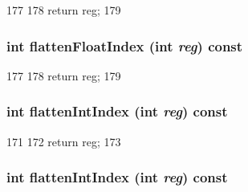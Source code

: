 \begin{DoxyCode}
177         {
178             return reg;
179         }
\end{DoxyCode}
\hypertarget{classMipsISA_1_1ISA_a85addcd4f57c5a0ffa81805dcad1eeb7}{
\subsubsection[{flattenFloatIndex}]{\setlength{\rightskip}{0pt plus 5cm}int flattenFloatIndex (int {\em reg}) const}}
\label{classMipsISA_1_1ISA_a85addcd4f57c5a0ffa81805dcad1eeb7}



\begin{DoxyCode}
177         {
178             return reg;
179         }
\end{DoxyCode}
\hypertarget{classMipsISA_1_1ISA_aece4b88ffcab608652e8e9f0fbe643d4}{
\subsubsection[{flattenIntIndex}]{\setlength{\rightskip}{0pt plus 5cm}int flattenIntIndex (int {\em reg}) const}}
\label{classMipsISA_1_1ISA_aece4b88ffcab608652e8e9f0fbe643d4}



\begin{DoxyCode}
171         {
172             return reg;
173         }
\end{DoxyCode}
\hypertarget{classMipsISA_1_1ISA_aece4b88ffcab608652e8e9f0fbe643d4}{
\subsubsection[{flattenIntIndex}]{\setlength{\rightskip}{0pt plus 5cm}int flattenIntIndex (int {\em reg}) const}}
\label{classMipsISA_1_1ISA_aece4b88ffcab608652e8e9f0fbe643d4}



